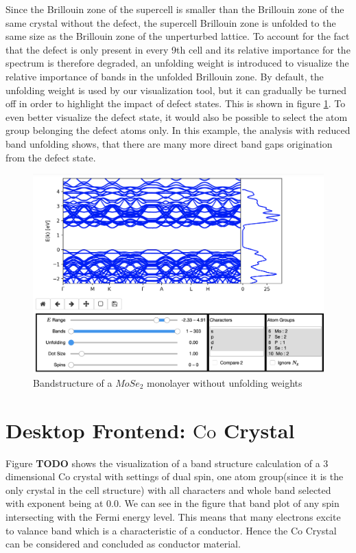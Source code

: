 Since the Brillouin zone of the supercell is smaller than the Brillouin zone of the same crystal without the defect, the supercell Brillouin zone is unfolded to the same size as the Brillouin zone of the unperturbed lattice. To account for the fact that the defect is only present in every 9th cell and its relative importance for the spectrum is therefore degraded, an unfolding weight is introduced to visualize the relative importance of bands in the unfolded Brillouin zone. By default, the unfolding weight is used by our visualization tool, but it can gradually be turned off in order to highlight the impact of defect states. This is shown in figure \ref{example3}. To even better visualize the defect state, it would also be possible to select the atom group belonging the defect atoms only. In this example, the analysis with reduced band unfolding shows, that there are many more direct band gaps origination from the defect state.


\begin{figure}[htb!]
    \centering
    \includegraphics[width=0.7\linewidth]{christian/screen3.png}
    \caption{Bandstructure of a $MoSe_2$ monolayer without unfolding weights}
    \label{example3}
\end{figure}


\section{Desktop Frontend: $\textrm{Co}$ Crystal}

Figure  \textbf{TODO} shows the visualization of a band structure calculation of a 3 dimensional Co crystal with settings of dual spin, one atom group(since it is the only crystal in the cell structure) with all characters and whole band selected with exponent being at $0.0$. We can see in the figure that band plot of any spin intersecting with the Fermi energy level. This means that many electrons excite to valance band which is a characteristic of a conductor. Hence the Co Crystal can be considered and concluded as conductor material.


